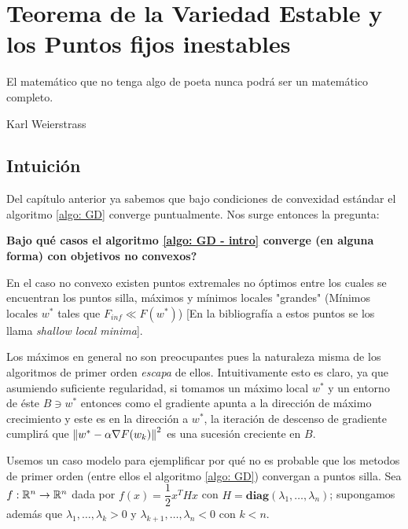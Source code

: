\chapter{Teorema de la Variedad Estable y los Puntos fijos inestables}\label{ch:teorema-de-variedad-estable}

\epigraph{El matem\'atico que no tenga algo de poeta nunca podr\'a ser un matem\'atico completo.}{Karl Weierstrass}

\section{Intuici\'on}

Del cap\'itulo anterior ya sabemos que bajo condiciones de convexidad est\'andar el algoritmo \ref{algo: GD} converge puntualmente. Nos surge entonces la pregunta:

\medskip 

\textbf{Bajo qu\'e casos el algoritmo \ref{algo: GD - intro} converge (en alguna forma) con objetivos no convexos?}

\medskip

En el caso no convexo existen puntos extremales no \'optimos entre los cuales se encuentran los puntos silla, m\'aximos y m\'inimos locales "grandes" (\Eg  M\'inimos locales $w^*$ tales que $F_{inf} \ll F(w^*)$) [En la bibliograf\'ia a estos puntos se los llama \textit{shallow local minima}]. 

Los m\'aximos en general no son preocupantes pues la naturaleza misma de los algoritmos de primer orden \textit{escapa} de ellos. Intuitivamente esto es claro, ya que asumiendo suficiente regularidad, si tomamos un m\'aximo local $w^*$ y un entorno de \'este $B \ni w^*$ entonces como el gradiente apunta a la direcci\'on de m\'aximo crecimiento y este es en la direcci\'on a $w^*$, la iteraci\'on de descenso de gradiente cumplir\'a que  $ \left\lVert w^*-\alpha \nabla F(w_k)\right\rVert^2$ es una sucesi\'on creciente en $B$.

\bigskip
Usemos un caso modelo para ejemplificar por qu\'e no es probable que los metodos de primer orden (entre ellos el algoritmo \ref{algo: GD}) convergan a puntos silla. Sea $f: {\mathbb{R}}^n \rightarrow {\mathbb{R}}^n$ dada por $f(x) = \dfrac{1}{2} x^THx$ con $H = \textbf{diag}\left(\lambda_1, \dots, \lambda_n\right)$; supongamos adem\'as que $\lambda_1, \dots, \lambda_k > 0$ y $\lambda_{k+1}, \dots, \lambda_n <0$ con $k<n$.

